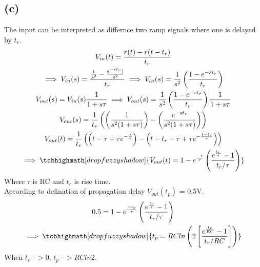 \documentclass{article}
\begin{document}
\subsection*{(c)}

The input can be interpreted as differnce two ramp signals where one is delayed by $t_r$.
\begin{gather*}
V_{in}(t) = \frac{r(t) - r(t - t_r)}{t_r}\\
\implies V_{in}(s) = \frac{\frac{1}{s^2} - \frac{e^{-st_r})}{s^2}}{t_r} \implies V_{in}(s) = \frac{1}{s^2}\left(\frac{1 - e^{-st_r}}{t_r}\right)\\
V_{out}(s) = V_{in}(s) \frac{1}{1 + s\tau} \implies V_{out}(s) = \frac{1}{s^2}\left(\frac{1 - e^{-st_r}}{t_r}\right)\frac{1}{1 + s\tau}\\
V_{out}(s) = \frac{1}{t_r}\left(\left(\frac{1}{s^2(1 + s\tau)}\right) - \left(\frac{e^{-st_r}}{s^2(1 + s\tau)}\right)\right)\\
V_{out}(t) = \frac{1}{t_r}\left(\left(t - \tau + {\tau}e^{-\frac{t}{\tau}}\right) - \left(t - t_r - \tau + {\tau}e^{-\frac{t-t_r}{\tau}}\right)\right)\\
\implies \tcbhighmath[drop fuzzy shadow]{V_{out}(t) = 1 - e^{\frac{-t}{\tau}}\left(\frac{e^{\frac{t_r}{\tau}} - 1}{t_r/{\tau}}\right)}
\end{gather*}
Where $\tau$ is RC and $t_r$ is rise time.\\
According to defination of propagation delay $V_{out}(t_p)$ = 0.5V.\\
\begin{gather*}
0.5 = 1 - e^{\frac{-t_p}{\tau}} \left(\frac{e^{\frac{t_r}{\tau}} - 1}{t_r/{\tau}}\right)\\
\implies \tcbhighmath[drop fuzzy shadow]{t_p = RCln \left(2\left[\frac{e^{\frac{t_r}{RC}} - 1}{t_r/{RC}}\right]\right)}
\end{gather*} 
When $t_r -> 0$, $t_p -> RCln2$. 
\end{document}
